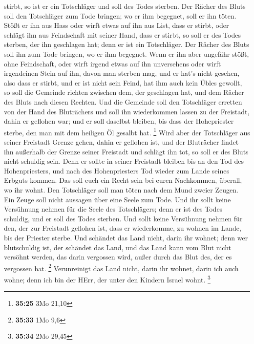 stirbt, so ist er ein Totschläger und soll des Todes sterben.
 Der Rächer des Bluts soll den Totschläger zum Tode
bringen; wo er ihm begegnet, soll er ihn töten.  Stößt er
ihn aus Hass oder wirft etwas auf ihn aus List, dass er stirbt,
 oder schlägt ihn aus Feindschaft mit seiner Hand, dass
er stirbt, so soll er des Todes sterben, der ihn geschlagen hat; denn er
ist ein Totschläger. Der Rächer des Bluts soll ihn zum Tode bringen, wo
er ihm begegnet.  Wenn er ihn aber ungefähr stößt, ohne
Feindschaft, oder wirft irgend etwas auf ihn unversehens 
oder wirft irgendeinen Stein auf ihn, davon man sterben mag, und er
hat's nicht gesehen, also dass er stirbt, und er ist nicht sein Feind,
hat ihm auch kein Übles gewollt,  so soll die Gemeinde
richten zwischen dem, der geschlagen hat, und dem Rächer des Bluts nach
diesen Rechten.  Und die Gemeinde soll den Totschläger
erretten von der Hand des Bluträchers und soll ihn wiederkommen lassen
zu der Freistadt, dahin er geflohen war; und er soll daselbst bleiben,
bis dass der Hohepriester sterbe, den man mit dem heiligen Öl gesalbt
hat. \footnote{\textbf{35:25} 3Mo 21,10}  Wird aber der
Totschläger aus seiner Freistadt Grenze gehen, dahin er geflohen ist,
 und der Bluträcher findet ihn außerhalb der Grenze
seiner Freistadt und schlägt ihn tot, so soll er des Bluts nicht
schuldig sein.  Denn er sollte in seiner Freistadt
bleiben bis an den Tod des Hohenpriesters, und nach des Hohenpriesters
Tod wieder zum Lande seines Erbguts kommen.  Das soll
euch ein Recht sein bei euren Nachkommen, überall, wo ihr wohnt.
 Den Totschläger soll man töten nach dem Mund zweier
Zeugen. Ein Zeuge soll nicht aussagen über eine Seele zum Tode.
 Und ihr sollt keine Versühnung nehmen für die Seele des
Totschlägers; denn er ist des Todes schuldig, und er soll des Todes
sterben.  Und sollt keine Versühnung nehmen für den, der
zur Freistadt geflohen ist, dass er wiederkomme, zu wohnen im Lande, bis
der Priester sterbe.  Und schändet das Land nicht, darin
ihr wohnet; denn wer blutschuldig ist, der schändet das Land, und das
Land kann vom Blut nicht versöhnt werden, das darin vergossen wird,
außer durch das Blut des, der es vergossen hat. \footnote{\textbf{35:33}
  1Mo 9,6}  Verunreinigt das Land nicht, darin ihr
wohnet, darin ich auch wohne; denn ich bin der HErr, der unter den
Kindern Israel wohnt. \footnote{\textbf{35:34} 2Mo 29,45}

